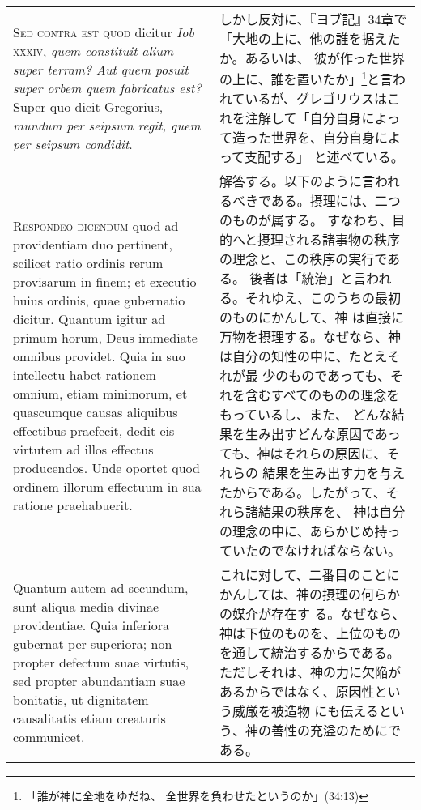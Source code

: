 \documentclass[10pt]{jsarticle} %
\begin{document}
\begin{longtable}{p{21em}p{21em}}
{\scshape Sed contra est quod} dicitur {\itshape Iob} {\scshape xxxiv}, {\itshape quem
constituit alium super terram? Aut quem posuit super orbem quem
fabricatus est?} Super quo dicit Gregorius, {\itshape mundum per seipsum regit,
quem per seipsum condidit}.

&

しかし反対に、『ヨブ記』34章で「大地の上に、他の誰を据えたか。あるいは、
彼が作った世界の上に、誰を置いたか」\footnote{「誰が神に全地をゆだね、
全世界を負わせたというのか」(34:13)}と言われているが、グレゴリウスはこ
れを注解して「自分自身によって造った世界を、自分自身によって支配する」
と述べている。
 
\\


{\scshape Respondeo dicendum} quod ad providentiam duo
pertinent, scilicet ratio ordinis rerum provisarum in finem; et executio
huius ordinis, quae gubernatio dicitur. Quantum igitur ad primum horum,
Deus immediate omnibus providet. Quia in suo intellectu habet rationem
omnium, etiam minimorum, et quascumque causas aliquibus effectibus
praefecit, dedit eis virtutem ad illos effectus producendos. Unde
oportet quod ordinem illorum effectuum in sua ratione
praehabuerit. 


&

解答する。以下のように言われるべきである。摂理には、二つのものが属する。
すなわち、目的へと摂理される諸事物の秩序の理念と、この秩序の実行である。
後者は「統治」と言われる。それゆえ、このうちの最初のものにかんして、神
は直接に万物を摂理する。なぜなら、神は自分の知性の中に、たとえそれが最
少のものであっても、それを含むすべてのものの理念をもっているし、また、
どんな結果を生み出すどんな原因であっても、神はそれらの原因に、それらの
結果を生み出す力を与えたからである。したがって、それら諸結果の秩序を、
神は自分の理念の中に、あらかじめ持っていたのでなければならない。


\\


Quantum autem ad secundum, sunt aliqua media divinae
providentiae. Quia inferiora gubernat per superiora; non propter
defectum suae virtutis, sed propter abundantiam suae bonitatis, ut
dignitatem causalitatis etiam creaturis communicet. 



&

これに対して、二番目のことにかんしては、神の摂理の何らかの媒介が存在す
る。なぜなら、神は下位のものを、上位のものを通して統治するからである。
ただしそれは、神の力に欠陥があるからではなく、原因性という威厳を被造物
にも伝えるという、神の善性の充溢のためにである。




\end{longtable}
\end{document}
